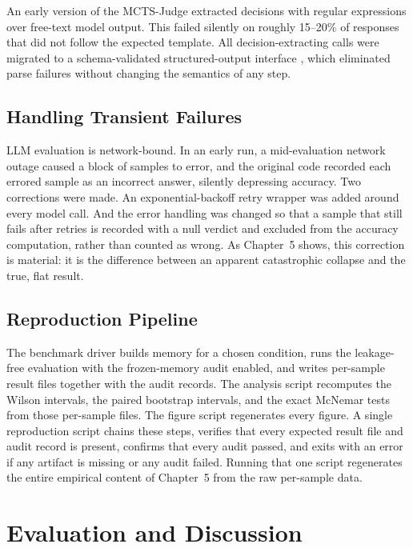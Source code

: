 \documentclass[14pt,a4paper]{extreport}
\begin{document}
An early version of the MCTS-Judge extracted decisions with regular expressions over free-text model output. This failed silently on roughly 15--20\% of responses that did not follow the expected template. All decision-extracting calls were migrated to a schema-validated structured-output interface \cite{pydantic2024}, which eliminated parse failures without changing the semantics of any step.

\section{Handling Transient Failures}

LLM evaluation is network-bound. In an early run, a mid-evaluation network outage caused a block of samples to error, and the original code recorded each errored sample as an incorrect answer, silently depressing accuracy. Two corrections were made. An exponential-backoff retry wrapper was added around every model call. And the error handling was changed so that a sample that still fails after retries is recorded with a null verdict and excluded from the accuracy computation, rather than counted as wrong. As Chapter~5 shows, this correction is material: it is the difference between an apparent catastrophic collapse and the true, flat result.

\section{Reproduction Pipeline}

The benchmark driver builds memory for a chosen condition, runs the leakage-free evaluation with the frozen-memory audit enabled, and writes per-sample result files together with the audit records. The analysis script recomputes the Wilson intervals, the paired bootstrap intervals, and the exact McNemar tests from those per-sample files. The figure script regenerates every figure. A single reproduction script chains these steps, verifies that every expected result file and audit record is present, confirms that every audit passed, and exits with an error if any artifact is missing or any audit failed. Running that one script regenerates the entire empirical content of Chapter~5 from the raw per-sample data.

\chapter{Evaluation and Discussion}
\end{document}

